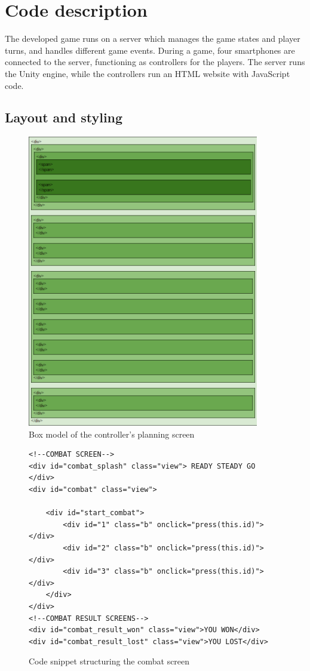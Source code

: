 \chapter{Code description}\label{ch:codeDescription}
The developed game runs on a server which manages the game states and player turns, and handles different game events. During a game, four smartphones are connected to the server, functioning as controllers for the players. The server runs the Unity engine, while the controllers run an HTML website with JavaScript code.

\section{Layout and styling}\label{sec:codeLayoutStyling}

\begin{figure}[h!]
	\centering
	\includegraphics[width=0.9\textwidth]{figures/controller_box_model.png}
	\caption{Box model of the controller's planning screen \label{fig:controllerBoxModel}}
\end{figure}

\begin{figure}
\begin{lstlisting}[language=HTML5]
<!--COMBAT SCREEN-->
<div id="combat_splash" class="view"> READY STEADY GO </div>
<div id="combat" class="view">

	<div id="start_combat">
		<div id="1" class="b" onclick="press(this.id)"></div>
		<div id="2" class="b" onclick="press(this.id)"></div>
		<div id="3" class="b" onclick="press(this.id)"></div>
	</div>
</div>
<!--COMBAT RESULT SCREENS-->
<div id="combat_result_won" class="view">YOU WON</div>
<div id="combat_result_lost" class="view">YOU LOST</div>
\end{lstlisting}
\caption{Code snippet structuring the combat screen \label{HTMLex}}
\end{figure}

